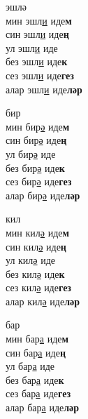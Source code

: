 \begin{multicols}{4}
\begin{enumerate}
\begin{minipage}{\linewidth}
    \item
    эшлә\\
    мин эшл\underline{и} иде\textbf{м}\\
    син эшл\underline{и} иде\textbf{ң}\\
    ул эшл\underline{и} иде\\
    без эшл\underline{и} иде\textbf{к}\\
    сез эшл\underline{и} иде\textbf{гез}\\
    алар эшл\underline{и} иде\textbf{ләр}\\
\end{minipage}

\begin{minipage}{\linewidth}
    \item
    бир\\
    мин бир\underline{ә} иде\textbf{м}\\
    син бир\underline{ә} иде\textbf{ң}\\
    ул бир\underline{ә} иде\\
    без бир\underline{ә} иде\textbf{к}\\
    сез бир\underline{ә} иде\textbf{гез}\\
    алар бир\underline{ә} иде\textbf{ләр}\\
\end{minipage}

\begin{minipage}{\linewidth}
    \item
    кил\\
    мин кил\underline{ә} иде\textbf{м}\\
    син кил\underline{ә} иде\textbf{ң}\\
    ул кил\underline{ә} иде\\
    без кил\underline{ә} иде\textbf{к}\\
    сез кил\underline{ә} иде\textbf{гез}\\
    алар кил\underline{ә} иде\textbf{ләр}\\
\end{minipage}

\begin{minipage}{\linewidth}
    \item
    бар\\
    мин бар\underline{а} иде\textbf{м}\\
    син бар\underline{а} иде\textbf{ң}\\
    ул бар\underline{а} иде\\
    без бар\underline{а} иде\textbf{к}\\
    сез бар\underline{а} иде\textbf{гез}\\
    алар бар\underline{а} иде\textbf{ләр}\\
\end{minipage}


\end{enumerate}
\end{multicols}
